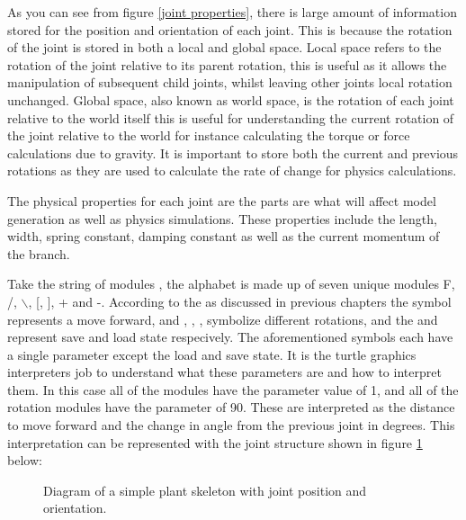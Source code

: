 \noindent
As you can see from figure \ref{joint properties}, there is large amount of information stored for the position and orientation of each joint. This is because the rotation of the joint is stored in both a local and global space. Local space refers to the rotation of the joint relative to its parent rotation, this is useful as it allows the manipulation of subsequent child joints, whilst leaving other joints local rotation unchanged. Global space, also known as world space, is the rotation of each joint relative to the world itself this is useful for understanding the current rotation of the joint relative to the world for instance calculating the torque or force calculations due to gravity. It is important to store both the current and previous rotations as they are used to calculate the rate of change for physics calculations.

The physical properties for each joint are the parts are what will affect model generation as well as physics simulations. These properties include the length, width, spring constant, damping constant as well as the current momentum of the branch. 

Take the string of modules , the alphabet is made up of seven unique modules F, /, $\backslash$, [, ], + and -. According to the as discussed in previous chapters the  symbol represents a move forward, and \say{+}, \say{-}, \say{/}, \say{$\backslash$} symbolize different rotations, and the \say{[} and \say{]} represent save and load state respecively. The aforementioned symbols each have a single parameter except the load and save state. It is the turtle graphics interpreters job to understand what these parameters are and how to interpret them. In this case all of the  modules have the parameter value of 1, and all of the rotation modules have the parameter of 90. These are interpreted as the distance to move forward and the change in angle from the previous joint in degrees. This interpretation can be represented with the joint structure shown in figure \ref{skeleton diagram} below:

\begin{figure}[htbp]
	{\centering
		\vspace{7px}
		\setlength{\fboxrule}{1pt}
		\caption{Diagram of a simple plant skeleton with joint position and orientation.} \label{skeleton diagram}
	}
\end{figure}
\FloatBarrier


